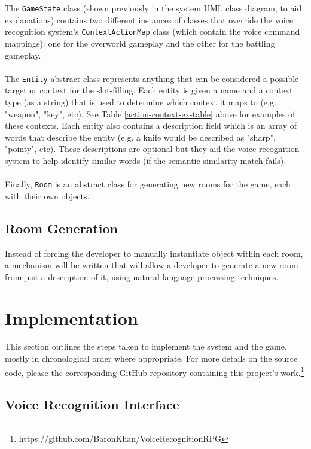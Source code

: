 \documentclass[12pt]{article}
\begin{document}
The \texttt{GameState} class (shown previously in the system UML class diagram, to aid explanations) contains two different instances of classes that override the voice recognition system's \texttt{ContextActionMap} class (which contain the voice command mappings): one for the overworld gameplay and the other for the battling gameplay.
\\
\\
The \texttt{Entity} abstract class represents anything that can be considered a possible target or context for the slot-filling. Each entity is given a name and a context type (as a string) that is used to determine which context it maps to (e.g. "weapon", "key", etc). See Table \ref{action-context-ex-table} above for examples of these contexts. Each entity also contains a description field which is an array of words that describe the entity (e.g. a knife would be described as "sharp", "pointy", etc). These descriptions are optional but they aid the voice recognition system to help identify similar words (if the semantic similarity match fails).
\\
\\
Finally, \texttt{Room} is an abstract class for generating new rooms for the game, each with their own objects.

\subsection{Room Generation}

Instead of forcing the developer to manually instantiate object within each room, a mechanism will be written that will allow a developer to generate a new room from just a description of it, using natural language processing techniques.

\newpage
\section{Implementation}

This section outlines the steps taken to implement the system and the game, mostly in chronological order where appropriate. For more details on the source code, please the corresponding GitHub repository containing this project's work.\footnote{https://github.com/BaronKhan/VoiceRecognitionRPG}

\subsection{Voice Recognition Interface}
\end{document}
